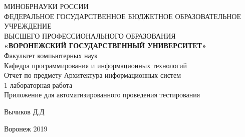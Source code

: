 \documentclass{article}
\begin{document}
\begin{center}
\hfill \break
\large{МИНОБРНАУКИ РОССИИ}\\
\footnotesize{ФЕДЕРАЛЬНОЕ ГОСУДАРСТВЕННОЕ БЮДЖЕТНОЕ ОБРАЗОВАТЕЛЬНОЕ УЧРЕЖДЕНИЕ}\\ 
\footnotesize{ВЫСШЕГО ПРОФЕССИОНАЛЬНОГО ОБРАЗОВАНИЯ}\\
\small{\textbf{«ВОРОНЕЖСКИЙ ГОСУДАРСТВЕННЫЙ УНИВЕРСИТЕТ»}}\\
\hfill \break
\normalsize{Факультет компьютерных наук}\\
    \hfill \break
\normalsize{Кафедра программирования и информационных технологий}\\
\hfill\break
\hfill \break
\hfill \break
\hfill \break
\large{Отчет по предмету Архитектура информационных систем
\\1 лабораторная работа
\\Приложение для автоматизированного проведения тестирования}\\
\end{center}

\hfill \break
\hfill \break
\hfill \break
\hfill \break
\hfill \break

\begin{flushright} Вычиков Д.Д \end{flushright}
\vspace*{\fill}
\begin{center} Воронеж 2019 \end{center}
\thispagestyle{empty}
\newpage
\end{document}
